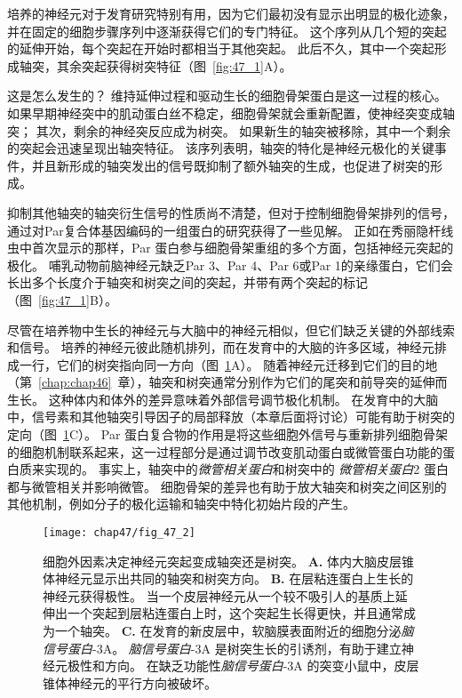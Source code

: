 培养的神经元对于发育研究特别有用，因为它们最初没有显示出明显的极化迹象，并在固定的细胞步骤序列中逐渐获得它们的专门特征。
这个序列从几个短的突起的延伸开始，每个突起在开始时都相当于其他突起。
此后不久，其中一个突起形成轴突，其余突起获得树突特征（图~\ref{fig:47_1}A）。


这是怎么发生的？
维持延伸过程和驱动生长的细胞骨架蛋白是这一过程的核心。
如果早期神经突中的肌动蛋白丝不稳定，细胞骨架就会重新配置，使神经突变成轴突；
其次，剩余的神经突反应成为树突。
如果新生的轴突被移除，其中一个剩余的突起会迅速呈现出轴突特征。
该序列表明，轴突的特化是神经元极化的关键事件，并且新形成的轴突发出的信号既抑制了额外轴突的生成，也促进了树突的形成。


抑制其他轴突的轴突衍生信号的性质尚不清楚，但对于控制细胞骨架排列的信号，通过对Par复合体基因编码的一组蛋白的研究获得了一些见解。
正如在秀丽隐杆线虫中首次显示的那样，Par 蛋白参与细胞骨架重组的多个方面，包括神经元突起的极化。
哺乳动物前脑神经元缺乏Par 3、Par 4、Par 6或Par 1的亲缘蛋白，它们会长出多个长度介于轴突和树突之间的突起，并带有两个突起的标记（图~\ref{fig:47_1}B）。


尽管在培养物中生长的神经元与大脑中的神经元相似，但它们缺乏关键的外部线索和信号。
培养的神经元彼此随机排列，而在发育中的大脑的许多区域，神经元排成一行，它们的树突指向同一方向（图~\ref{fig:47_2}A）。
随着神经元迁移到它们的目的地（第~\ref{chap:chap46}~章），轴突和树突通常分别作为它们的尾突和前导突的延伸而生长。
这种体内和体外的差异意味着外部信号调节极化机制。 在发育中的大脑中，信号素和其他轴突引导因子的局部释放（本章后面将讨论）可能有助于树突的定向（图~\ref{fig:47_2}C）。
Par 蛋白复合物的作用是将这些细胞外信号与重新排列细胞骨架的细胞机制联系起来，这一过程部分是通过调节改变肌动蛋白或微管蛋白功能的蛋白质来实现的。
事实上，轴突中的\textit{微管相关蛋白}和树突中的 \textit{微管相关蛋白}2 蛋白都与微管相关并影响微管。
细胞骨架的差异也有助于放大轴突和树突之间区别的其他机制，例如分子的极化运输和轴突中特化初始片段的产生。


\begin{figure}[htbp]
	\centering
	\texttt{[image: chap47/fig\_47\_2]}
	\caption{细胞外因素决定神经元突起变成轴突还是树突。
		\textbf{A.} 体内大脑皮层锥体神经元显示出共同的轴突和树突方向。
		\textbf{B.} 在层粘连蛋白上生长的神经元获得极性。
		当一个皮层神经元从一个较不吸引人的基质上延伸出一个突起到层粘连蛋白上时，这个突起生长得更快，并且通常成为一个轴突。
		\textbf{C.} 在发育的新皮层中，软脑膜表面附近的细胞分泌\textit{脑信号蛋白}-3A。
		\textit{脑信号蛋白}-3A 是树突生长的引诱剂，有助于建立神经元极性和方向。
		在缺乏功能性\textit{脑信号蛋白}-3A 的突变小鼠中，皮层锥体神经元的平行方向被破坏。}
	\label{fig:47_2}
\end{figure}


